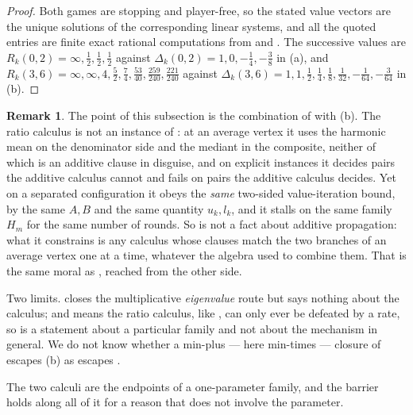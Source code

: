 \documentclass[11pt]{article}
\theoremstyle{plain}
\theoremstyle{definition}
\newtheorem{remark}[theorem]{Remark}
\begin{document}
\begin{proof}
Both games are stopping and player-free, so the stated value vectors are
the unique solutions of the corresponding linear systems, and all the
quoted entries are finite exact rational computations from
 and . The successive values are
$R_k(0,2)=\infty,\tfrac12,\tfrac12,\tfrac12$ against
$\Delta_k(0,2)=1,0,-\tfrac14,-\tfrac38$ in (a), and
$R_k(3,6)=\infty,\infty,4,\tfrac52,\tfrac74,\tfrac{53}{40},
\tfrac{259}{240},\tfrac{221}{240}$ against
$\Delta_k(3,6)=1,1,\tfrac12,\tfrac14,\tfrac18,\tfrac1{32},
-\tfrac1{64},-\tfrac3{64}$ in (b).
\end{proof}

\begin{remark}\label{rem:ratio}
The point of this subsection is the combination of
 with (b). The
ratio calculus is not an instance of : at an average
vertex it uses the harmonic mean on the denominator side and the mediant
in the composite, neither of which is an additive clause in disguise, and
on explicit instances it decides pairs the additive calculus cannot and
fails on pairs the additive calculus decides. Yet on a separated
configuration it obeys the \emph{same} two-sided value-iteration bound,
by the same $A,B$ and the same quantity $u_k,l_k$, and it stalls on the
same family $H_m$ for the same number of rounds. So
 is not a fact about additive propagation: what
it constrains is any calculus whose clauses match the two branches of an
average vertex one at a time, whatever the algebra used to combine them.
That is the same moral as , reached from the other
side.

Two limits.  closes the multiplicative \emph{eigenvalue}
route but says nothing about the calculus; and
 means the ratio calculus, like
, can only ever be defeated by a rate, so
 is a statement about a particular family and not
about the mechanism in general. We do not know whether a min-plus ---
here min-times --- closure of  escapes
(b) as  escapes
.
\end{remark}


The two calculi are the endpoints of a one-parameter family, and the
barrier holds along all of it for a reason that does not involve the
parameter.
\end{document}
